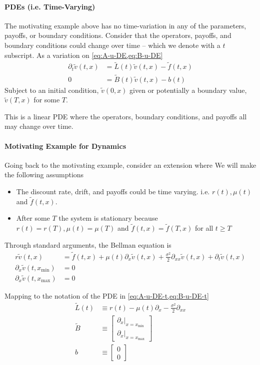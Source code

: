 \documentclass[11pt]{article}
\newcommand{\D}[1][]{\ensuremath{\partial_{#1}}}
\theoremstyle{definition}
\begin{document}
\paragraph{PDEs (i.e. Time-Varying)}
The motivating example above has no time-variation in any of the parameters, payoffs, or boundary conditions. Consider that the operators, payoffs, and boundary conditions could change over time -- which we denote with a $t$ subscript. As a variation on \cref{eq:A-u-DE,eq:B-u-DE}
\begin{align}
	\D[t] \tilde{v}(t,x) &= \tilde{L}(t) \tilde{v}(t, x) - \tilde{f}(t, x)\label{eq:A-u-DE-t}\\
	0 &= \tilde{B}(t) \tilde{v}(t, x) - b(t)\label{eq:B-u-DE-t}
\end{align}
Subject to an initial condition, $\tilde{v}(0,x)$ given or potentially a boundary value, $\tilde{v}(T,x)$ for some $T$.

This is a linear PDE where the operators, boundary conditions, and payoffs all may change over time.


\paragraph{Motivating Example for Dynamics}
Going back to the motivating example, consider an extension where   We will make the following assumptions
\begin{itemize}
	\item The discount rate, drift, and payoffs could be time varying. i.e. $r(t), \mu(t)$ and $\tilde{f}(t,x)$.
	\item After some $T$ the system is stationary because $r(t) = r(T), \mu(t) = \mu(T)$ and $\tilde{f}(t,x) = \tilde{f}(T,x)$ for all $t \geq T$
\end{itemize}

\noindent Through standard arguments, the Bellman equation is
\begin{align}
	r \tilde{v}(t, x) &= \tilde{f}(t, x) + \mu(t) \D[x] \tilde{v}(t,x) + \frac{\sigma^2}{2} \D[xx]\tilde{v}(t,x) + \D[t] \tilde{v}(t, x)\\
	\D[x]\tilde{v}(t, x_{\min}) &= 0\\
	\D[x] \tilde{v}(t, x_{\max}) &= 0
\end{align}

\noindent Mapping to the notation of the PDE in \cref{eq:A-u-DE-t,eq:B-u-DE-t}
\begin{align}
	\tilde{L}(t) &\equiv r(t) - \mu(t) \D[x] - \frac{\sigma^2}{2}\D[xx]\\
	\tilde{B} &\equiv \begin{bmatrix}
	\partial_x\vert_{x = x_{\min}}\\
	\partial_x\vert_{x = x_{\max}}
\end{bmatrix}\\
b &\equiv \begin{bmatrix} 0\\ 0 \end{bmatrix}
\end{align}
\end{document}

